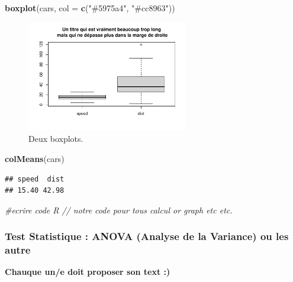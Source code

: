 \documentclass[mstat,12pt]{unswthesis}
\newenvironment{Shaded}{\begin{snugshade}}{\end{snugshade}}
\newcommand{\AttributeTok}[1]{\textcolor[rgb]{0.13,0.29,0.53}{#1}}
\newcommand{\CommentTok}[1]{\textcolor[rgb]{0.56,0.35,0.01}{\textit{#1}}}
\newcommand{\FunctionTok}[1]{\textcolor[rgb]{0.13,0.29,0.53}{\textbf{#1}}}
\newcommand{\NormalTok}[1]{#1}
\newcommand{\StringTok}[1]{\textcolor[rgb]{0.31,0.60,0.02}{#1}}
\begin{document}
\begin{Shaded}
\begin{Highlighting}[]
\FunctionTok{boxplot}\NormalTok{(cars, }\AttributeTok{col =} \FunctionTok{c}\NormalTok{(}\StringTok{"\#5975a4"}\NormalTok{, }\StringTok{"\#cc8963"}\NormalTok{))}
\end{Highlighting}
\end{Shaded}

\begin{figure}

{\centering \includegraphics[width=7cm]{scdon2-UPV-report-template_sansPython_files/figure-latex/unnamed-chunk-4-1} 

}

\caption{\label{fig:boxplots}Deux boxplots.}\label{fig:unnamed-chunk-4}
\end{figure}

\begin{Shaded}
\begin{Highlighting}[]
\FunctionTok{colMeans}\NormalTok{(cars)}
\end{Highlighting}
\end{Shaded}

\begin{verbatim}
## speed  dist 
## 15.40 42.98
\end{verbatim}

\begin{Shaded}
\begin{Highlighting}[]
 \CommentTok{\#ecrire code R // notre code pour tous calcul or graph etc etc. }
\end{Highlighting}
\end{Shaded}

\subsubsection{Test Statistique : ANOVA (Analyse de la Variance) ou les
autre}\label{test-statistique-anova-analyse-de-la-variance-ou-les-autre}

\textbf{Chauque un/e doit proposer son text :) }
\end{document}
